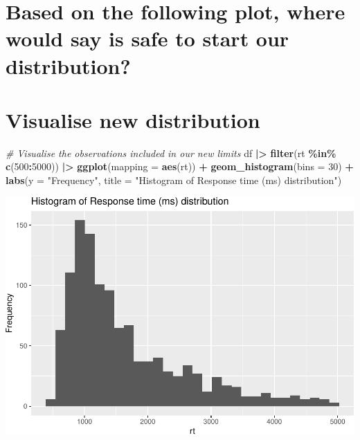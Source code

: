 \documentclass[
]{article}
\newenvironment{Shaded}{\begin{snugshade}}{\end{snugshade}}
\newcommand{\AttributeTok}[1]{\textcolor[rgb]{0.13,0.29,0.53}{#1}}
\newcommand{\CommentTok}[1]{\textcolor[rgb]{0.56,0.35,0.01}{\textit{#1}}}
\newcommand{\DecValTok}[1]{\textcolor[rgb]{0.00,0.00,0.81}{#1}}
\newcommand{\FunctionTok}[1]{\textcolor[rgb]{0.13,0.29,0.53}{\textbf{#1}}}
\newcommand{\NormalTok}[1]{#1}
\newcommand{\SpecialCharTok}[1]{\textcolor[rgb]{0.81,0.36,0.00}{\textbf{#1}}}
\newcommand{\StringTok}[1]{\textcolor[rgb]{0.31,0.60,0.02}{#1}}
\begin{document}
\hypertarget{based-on-the-following-plot-where-would-say-is-safe-to-start-our-distribution}{%
\section{Based on the following plot, where would say is safe to start
our
distribution?}\label{based-on-the-following-plot-where-would-say-is-safe-to-start-our-distribution}}

\hypertarget{visualise-new-distribution}{%
\section{Visualise new distribution}\label{visualise-new-distribution}}

\begin{Shaded}
\begin{Highlighting}[]
\CommentTok{\# Visualise the observations included in our new limits}
\NormalTok{df }\SpecialCharTok{|\textgreater{}}
  \FunctionTok{filter}\NormalTok{(rt }\SpecialCharTok{\%in\%} \FunctionTok{c}\NormalTok{(}\DecValTok{500}\SpecialCharTok{:}\DecValTok{5000}\NormalTok{)) }\SpecialCharTok{|\textgreater{}}
  \FunctionTok{ggplot}\NormalTok{(}\AttributeTok{mapping =} \FunctionTok{aes}\NormalTok{(rt)) }\SpecialCharTok{+}
  \FunctionTok{geom\_histogram}\NormalTok{(}\AttributeTok{bins =} \DecValTok{30}\NormalTok{) }\SpecialCharTok{+} 
  \FunctionTok{labs}\NormalTok{(}\AttributeTok{y =} \StringTok{"Frequency"}\NormalTok{,}
       \AttributeTok{title =} \StringTok{"Histogram of Response time (ms) distribution"}\NormalTok{)}
\end{Highlighting}
\end{Shaded}

\includegraphics{T5_Data_wrangling_pdf_files/figure-latex/unnamed-chunk-11-1.pdf}
\end{document}

